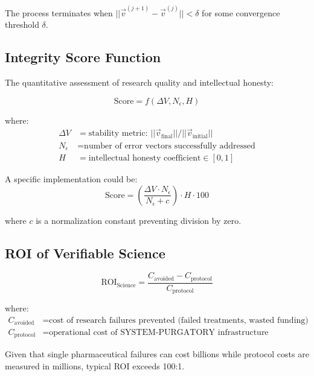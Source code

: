 \documentclass[11pt,a4paper]{article}
\begin{document}
\noindent The process terminates when $||\vec{v}^{(j+1)} - \vec{v}^{(j)}|| < \delta$ for some convergence threshold $\delta$.

\subsection*{Integrity Score Function}
The quantitative assessment of research quality and intellectual honesty:

\begin{equation}
\text{Score} = f(\Delta V, N_{\epsilon}, H)
\label{eq:integrity_score}
\end{equation}

where:
\begin{align*}
\Delta V &= \text{stability metric: } ||\vec{v}_{\text{final}}|| / ||\vec{v}_{\text{initial}}|| \\
N_{\epsilon} &= \text{number of error vectors successfully addressed} \\
H &= \text{intellectual honesty coefficient} \in [0, 1]
\end{align*}

\noindent A specific implementation could be:
\begin{equation}
\text{Score} = \left(\frac{\Delta V \cdot N_{\epsilon}}{N_{\epsilon} + c}\right) \cdot H \cdot 100
\label{eq:score_implementation}
\end{equation}

where $c$ is a normalization constant preventing division by zero.

\subsection*{ROI of Verifiable Science}
\begin{equation}
\text{ROI}_{\text{Science}} = \frac{C_{\text{avoided}} - C_{\text{protocol}}}{C_{\text{protocol}}}
\label{eq:roi_science}
\end{equation}

where:
\begin{align*}
C_{\text{avoided}} &= \text{cost of research failures prevented (failed treatments, wasted funding)} \\
C_{\text{protocol}} &= \text{operational cost of SYSTEM-PURGATORY infrastructure}
\end{align*}

\noindent Given that single pharmaceutical failures can cost billions while protocol costs are measured in millions, typical ROI exceeds 100:1.
\end{document}
